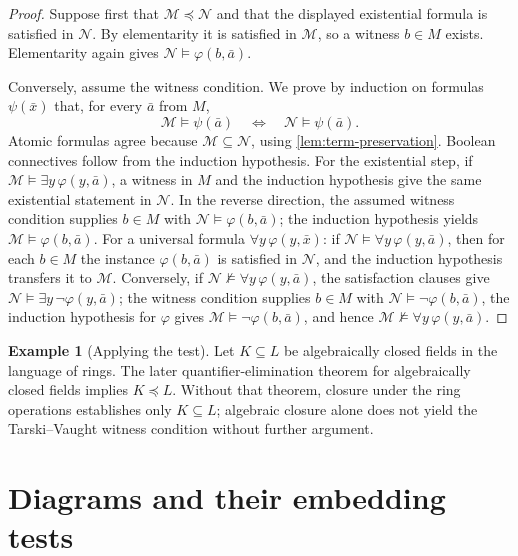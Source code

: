 \documentclass[11pt,oneside,openany]{book}
\theoremstyle{definition}
\newtheorem{example}[definition]{Example}
\theoremstyle{plain}
\theoremstyle{remark}
\newcommand{\entails}{\models}
\newcommand{\notentails}{\not\models}
\begin{document}
\begin{proof}
Suppose first that \(\mathcal M\preccurlyeq\mathcal N\) and that the
displayed existential formula is satisfied in \(\mathcal N\).  By
elementarity it is satisfied in
\(\mathcal M\), so a witness \(b\in M\) exists.  Elementarity again gives
\(\mathcal N\entails\varphi(b,\bar a)\).

Conversely, assume the witness condition.  We prove by induction on formulas
\(\psi(\bar x)\) that, for every \(\bar a\) from \(M\),
\[
  \mathcal M\entails\psi(\bar a)
  \quad\Longleftrightarrow\quad
  \mathcal N\entails\psi(\bar a).
\]
Atomic formulas agree because \(\mathcal M\subseteq\mathcal N\), using
\cref{lem:term-preservation}.  Boolean connectives follow from the induction
hypothesis.  For the existential step, if
\(\mathcal M\entails\exists y\,\varphi(y,\bar a)\), a witness in \(M\) and the
induction hypothesis give the same existential statement in \(\mathcal N\).
In the reverse direction, the assumed witness condition supplies \(b\in M\)
with \(\mathcal N\entails\varphi(b,\bar a)\); the induction hypothesis yields
\(\mathcal M\entails\varphi(b,\bar a)\).  For a universal formula
\(\forall y\,\varphi(y,\bar x)\): if
\(\mathcal N\entails\forall y\,\varphi(y,\bar a)\), then for each
\(b\in M\) the instance \(\varphi(b,\bar a)\) is satisfied in
\(\mathcal N\), and the induction hypothesis transfers it to
\(\mathcal M\).  Conversely, if
\(\mathcal N\notentails\forall y\,\varphi(y,\bar a)\), the satisfaction
clauses give \(\mathcal N\entails\exists y\,\neg\varphi(y,\bar a)\); the
witness condition supplies \(b\in M\) with
\(\mathcal N\entails\neg\varphi(b,\bar a)\), the induction hypothesis for
\(\varphi\) gives \(\mathcal M\entails\neg\varphi(b,\bar a)\), and hence
\(\mathcal M\notentails\forall y\,\varphi(y,\bar a)\).
\end{proof}

\begin{example}[Applying the test]
Let \(K\subseteq L\) be algebraically closed fields in the language of rings.
The later quantifier-elimination theorem for algebraically closed fields
implies \(K\preccurlyeq L\).  Without that theorem, closure under the ring
operations establishes only \(K\subseteq L\); algebraic closure alone does
not yield the Tarski--Vaught witness condition without further argument.
\end{example}

\section{Diagrams and their embedding tests}
\label{sec:maps-elementarity-04}
\label{sec:diagrams}
\end{document}
